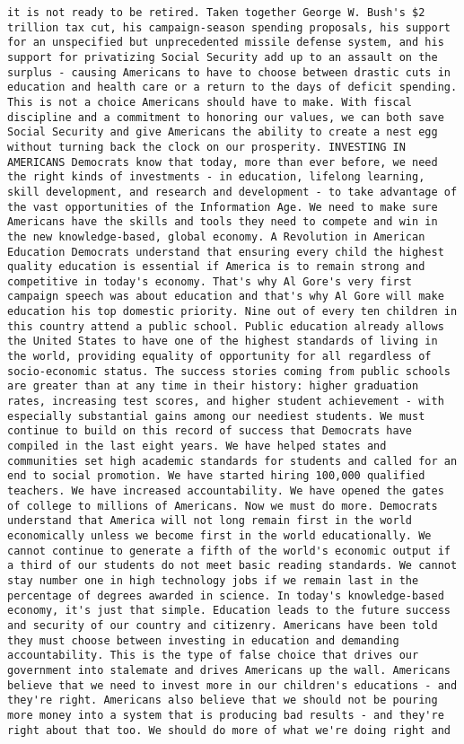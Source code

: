 \documentclass[
]{article}
\begin{document}
\begin{verbatim}
it is not ready to be retired. Taken together George W. Bush's $2 trillion tax cut, his campaign-season spending proposals, his support for an unspecified but unprecedented missile defense system, and his support for privatizing Social Security add up to an assault on the surplus - causing Americans to have to choose between drastic cuts in education and health care or a return to the days of deficit spending. This is not a choice Americans should have to make. With fiscal discipline and a commitment to honoring our values, we can both save Social Security and give Americans the ability to create a nest egg without turning back the clock on our prosperity. INVESTING IN AMERICANS Democrats know that today, more than ever before, we need the right kinds of investments - in education, lifelong learning, skill development, and research and development - to take advantage of the vast opportunities of the Information Age. We need to make sure Americans have the skills and tools they need to compete and win in the new knowledge-based, global economy. A Revolution in American Education Democrats understand that ensuring every child the highest quality education is essential if America is to remain strong and competitive in today's economy. That's why Al Gore's very first campaign speech was about education and that's why Al Gore will make education his top domestic priority. Nine out of every ten children in this country attend a public school. Public education already allows the United States to have one of the highest standards of living in the world, providing equality of opportunity for all regardless of socio-economic status. The success stories coming from public schools are greater than at any time in their history: higher graduation rates, increasing test scores, and higher student achievement - with especially substantial gains among our neediest students. We must continue to build on this record of success that Democrats have compiled in the last eight years. We have helped states and communities set high academic standards for students and called for an end to social promotion. We have started hiring 100,000 qualified teachers. We have increased accountability. We have opened the gates of college to millions of Americans. Now we must do more. Democrats understand that America will not long remain first in the world economically unless we become first in the world educationally. We cannot continue to generate a fifth of the world's economic output if a third of our students do not meet basic reading standards. We cannot stay number one in high technology jobs if we remain last in the percentage of degrees awarded in science. In today's knowledge-based economy, it's just that simple. Education leads to the future success and security of our country and citizenry. Americans have been told they must choose between investing in education and demanding accountability. This is the type of false choice that drives our government into stalemate and drives Americans up the wall. Americans believe that we need to invest more in our children's educations - and they're right. Americans also believe that we should not be pouring more money into a system that is producing bad results - and they're right about that too. We should do more of what we're doing right and 
\end{verbatim}
\end{document}
